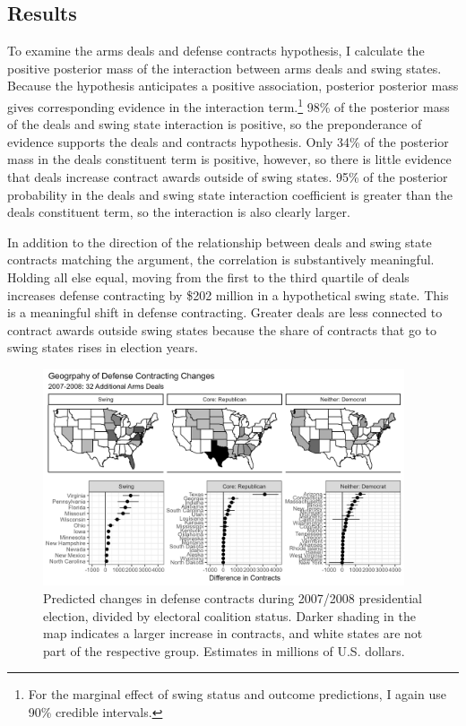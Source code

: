\documentclass[12pt]{article}
\begin{document}
\subsection{Results}


To examine the arms deals and defense contracts hypothesis, I calculate the positive posterior mass of the interaction between arms deals and swing states. Because the hypothesis anticipates a positive association, posterior posterior mass gives corresponding evidence in the interaction term.\footnote{For the marginal effect of swing status and outcome predictions, I again use 90\% credible intervals.}
98\% of the posterior mass of the deals and swing state interaction is positive, so the preponderance of evidence supports the deals and contracts hypothesis.
Only 34\% of the posterior mass in the deals constituent term is positive, however, so there is little evidence that deals increase contract awards outside of swing states.
95\% of the posterior probability in the deals and swing state interaction coefficient is greater than the deals constituent term, so the interaction is also clearly larger. 


In addition to the direction of the relationship between deals and swing state contracts matching the argument, the correlation is substantively meaningful. 
Holding all else equal, moving from the first to the third quartile of deals increases defense contracting by \$202 million in a hypothetical swing state. 
This is a meaningful shift in defense contracting. 
Greater deals are less connected to contract awards outside swing states because the share of contracts that go to swing states rises in election years. 


\begin{figure}[htpb]
	\centering
		\includegraphics[width=0.95\textwidth]{../figures/map-08-full.png}
	\caption{Predicted changes in defense contracts during 2007/2008 presidential election, divided by electoral coalition status. Darker shading in the map indicates a larger increase in contracts, and white states are not part of the respective group. Estimates in millions of U.S. dollars.}
	\label{fig:map-08-full}
\end{figure}
\end{document}

